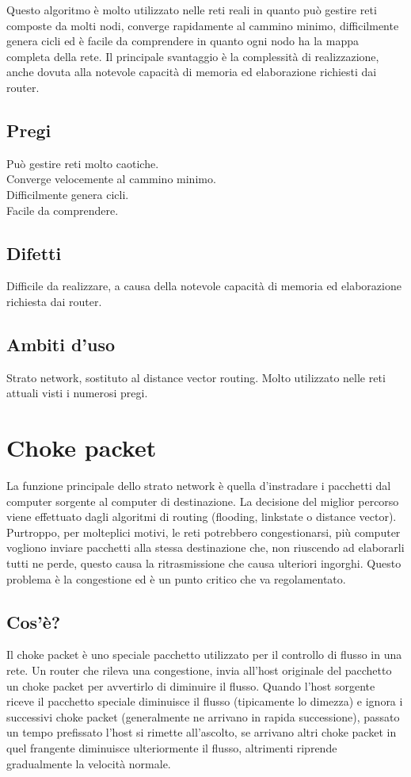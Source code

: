 Questo algoritmo è molto utilizzato nelle reti reali in quanto può gestire reti composte da molti nodi, converge rapidamente al cammino minimo, difficilmente genera cicli ed è facile da comprendere in quanto ogni nodo ha la mappa completa della rete. Il principale svantaggio è la complessità di realizzazione, anche dovuta alla notevole capacità di memoria ed elaborazione richiesti dai router.

\subsection{Pregi}
Può gestire reti molto caotiche.\\
Converge velocemente al cammino minimo.\\
Difficilmente genera cicli.\\
Facile da comprendere.

\subsection{Difetti}
Difficile da realizzare, a causa della notevole capacità di memoria ed elaborazione richiesta dai router.

\subsection{Ambiti d'uso}
Strato network, sostituto al distance vector routing.
Molto utilizzato nelle reti attuali visti i numerosi pregi.

\section{Choke packet}

La funzione principale dello strato network è quella d'instradare i pacchetti dal computer sorgente al computer di destinazione. La decisione del miglior percorso viene effettuato dagli algoritmi di routing (flooding, linkstate o distance vector). Purtroppo, per molteplici motivi, le reti potrebbero congestionarsi, più computer vogliono inviare pacchetti alla stessa destinazione che, non riuscendo ad elaborarli tutti ne perde, questo causa la ritrasmissione che causa ulteriori ingorghi. Questo problema è la congestione ed è un punto critico che va regolamentato.
\subsection{Cos'è?}
Il choke packet è uno speciale pacchetto utilizzato per il controllo di flusso in una rete. Un router che rileva una congestione, invia all'host originale del pacchetto un choke packet per avvertirlo di diminuire il flusso. Quando l'host sorgente riceve il pacchetto speciale diminuisce il flusso (tipicamente lo dimezza) e ignora i successivi choke packet (generalmente ne arrivano in rapida successione), passato un tempo prefissato l'host si rimette all'ascolto, se arrivano altri choke packet in quel frangente diminuisce ulteriormente il flusso, altrimenti riprende gradualmente la velocità normale.

